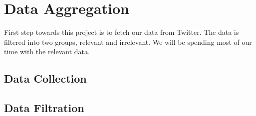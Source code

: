 
\chapter{Data Aggregation}
First step towards this project is to fetch our data from Twitter. The data is filtered into two
groups, relevant and irrelevant. We will be spending most of our time with the relevant data.


\section{Data Collection}


\section{Data Filtration}


